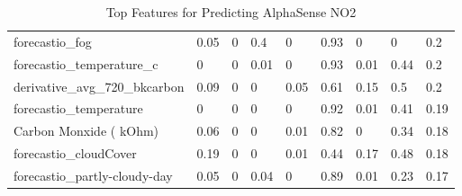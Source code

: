 \begin{table}[]
\begin{tabular}{lllllllll}
forecastio\_fog                   & 0.05  & 0     & 0.4        & 0    & 0.93 & 0     & 0         & 0.2  \\
forecastio\_temperature\_c        & 0     & 0     & 0.01       & 0    & 0.93 & 0.01  & 0.44      & 0.2  \\
derivative\_avg\_720\_bkcarbon    & 0.09  & 0     & 0          & 0.05 & 0.61 & 0.15  & 0.5       & 0.2  \\
forecastio\_temperature           & 0     & 0     & 0          & 0    & 0.92 & 0.01  & 0.41      & 0.19 \\
Carbon Monxide ( kOhm)            & 0.06  & 0     & 0          & 0.01 & 0.82 & 0     & 0.34      & 0.18 \\
forecastio\_cloudCover            & 0.19  & 0     & 0          & 0.01 & 0.44 & 0.17  & 0.48      & 0.18 \\
forecastio\_partly-cloudy-day     & 0.05  & 0     & 0.04       & 0    & 0.89 & 0.01  & 0.23      & 0.17 \\
\bottomrule
\end{tabular}
\label{tab:as_no2_top_features}
\caption{Top Features for Predicting AlphaSense NO2}
\end{table}
